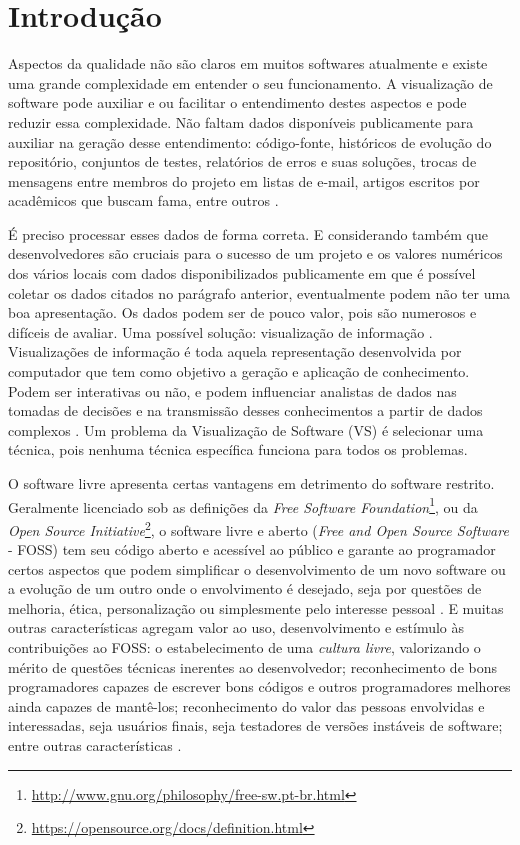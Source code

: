 \chapter{Introdução}

Aspectos da qualidade não são claros em muitos softwares atualmente e existe
uma grande complexidade em entender o seu funcionamento. A visualização de
software pode auxiliar e ou facilitar o entendimento destes aspectos e pode
reduzir essa complexidade. Não faltam dados disponíveis publicamente para
auxiliar na geração desse entendimento: código-fonte, históricos de evolução do
repositório, conjuntos de testes, relatórios de erros e suas soluções, trocas
de mensagens entre membros do projeto em listas de e-mail, artigos escritos por
acadêmicos que buscam fama, entre outros \cite{messias2012}
\cite{benkler2006wealth}.

É preciso processar esses dados de forma correta. E considerando também que
desenvolvedores são cruciais para o sucesso de um projeto e os valores
numéricos dos vários locais com dados disponibilizados publicamente em que é
possível coletar os dados citados no parágrafo anterior, eventualmente podem não ter
uma boa apresentação. Os dados podem ser de pouco valor, pois são numerosos e
difíceis de avaliar. Uma possível solução: visualização de informação
\cite{messias2012}. Visualizações de informação é toda aquela representação
desenvolvida por computador que tem como objetivo a geração e aplicação de
conhecimento. Podem ser interativas ou não, e podem influenciar analistas de
dados nas tomadas de decisões e na transmissão desses conhecimentos a partir de
dados complexos \cite{card1999readings}. Um problema da Visualização de Software
(VS) é selecionar uma técnica, pois nenhuma técnica específica funciona para
todos os problemas.

O software livre apresenta certas vantagens em detrimento do software restrito.
Geralmente licenciado sob as definições da
\textit{Free Software Foundation}\footnote{\url{http://www.gnu.org/philosophy/free-sw.pt-br.html}},
ou da \textit{Open Source Initiative}\footnote{\url{https://opensource.org/docs/definition.html}},
o software livre e aberto (\textit{Free and Open Source Software} - FOSS) tem
seu código aberto e acessível ao público e garante ao programador certos
aspectos que podem simplificar o desenvolvimento de um novo software ou a
evolução de um outro onde o envolvimento é desejado, seja por questões de
melhoria, ética, personalização ou simplesmente pelo interesse pessoal
\cite{meirelles2013monitoramento}. E muitas outras características agregam
valor ao uso, desenvolvimento e estímulo às contribuições ao FOSS: o
estabelecimento de uma \textit{cultura livre}, valorizando o mérito de questões
técnicas inerentes ao desenvolvedor; reconhecimento de bons programadores
capazes de escrever bons códigos e outros programadores melhores ainda capazes de
mantê-los; reconhecimento do valor das pessoas envolvidas e interessadas, seja
usuários finais, seja testadores de versões instáveis de software; entre outras
características \cite{raymond1999cathedral}.

